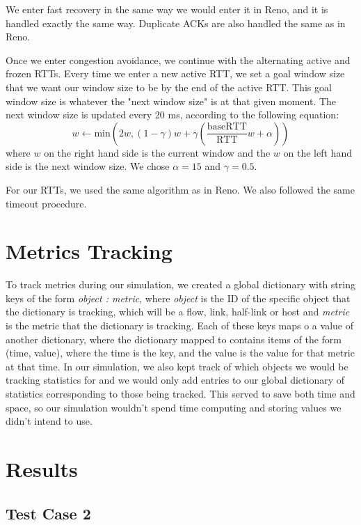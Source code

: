 \documentclass{article}
\begin{document}
We enter fast recovery in the same way we would enter it in Reno, and it is handled exactly the same way. Duplicate ACKs are also handled the same as in Reno.

Once we enter congestion avoidance, we continue with the alternating active and frozen RTTs. Every time we enter a new active RTT, we set a goal window size that we want our window size to be by the end of the active RTT. This goal window size is whatever the "next window size" is at that given moment. The next window size is updated every 20 ms, according to the following equation: $$ w \leftarrow \textrm{min}(2w, (1-\gamma)w + \gamma(\frac{\textrm{baseRTT}}{\textrm{RTT}}w + \alpha)) $$
where $w$ on the right hand side is the current window and the $w$ on the left hand side is the next window size. We chose $\alpha = 15$ and $\gamma = 0.5$. 

For our RTTs, we used the same algorithm as in Reno. We also followed the same timeout procedure.


\section{Metrics Tracking}

To track metrics during our simulation, we created a global dictionary with string keys of the form {\em object : metric}, where {\em object} is the ID of the specific object that the dictionary is tracking, which will be a flow, link, half-link or host and {\em metric} is the metric that the dictionary is tracking. Each of these keys maps o a value of another dictionary, where the dictionary mapped to contains items of the form (time, value), where the time is the key, and the value is the value for that metric at that time. In our simulation, we also kept track of which objects we would be tracking statistics for and we would only add entries to our global dictionary of statistics corresponding to those being tracked. This served to save both time and space, so our simulation wouldn't spend time computing and storing values we didn't intend to use. 


\section{Results}

\subsection{Test Case 2}
\end{document}
